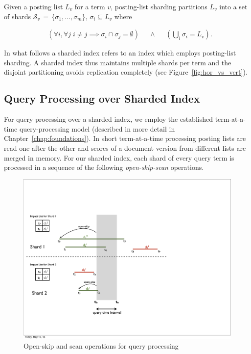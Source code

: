 \begin{definition}
Given a posting list $L_{v}$ for a term $v$, posting-list sharding partitions $L_{v}$ into a set of shards $\mathcal{S}_v \,=\, \{\sigma_1, \ldots, \sigma_{m}\}, \, \sigma_{i} \subseteq L_{v}$ where

\begin{equation*}
	\begin{aligned}
		& \left( \forall i,\forall j \; i \neq j \implies \sigma_{i} \cap \sigma_{j} = \emptyset \right) 
		& & \wedge & 
		& \left( \bigcup_{i}{\sigma_i} =  L_{v} \right).  
	\end{aligned}
\end{equation*}

\end{definition}

In what follows a sharded index refers to an index which employs posting-list sharding. A sharded index thus maintains multiple shards per term and the disjoint partitioning avoids replication completely (see Figure~\ref{fig:hor_vs_vert}). 

\subsection{Query Processing over Sharded Index}

For query processing over a sharded index, we employ the established term-at-a-time query-processing 
model (described in more detail in Chapter~\ref{chap:foundations}). In short term-at-a-time processing posting lists are read one after the other and scores of a document version from different lists are merged in memory. For our sharded index, each shard of every query term is processed in a sequence of the following \emph{open-skip-scan} operations.

\begin{figure}[tb]
	\centering
		\includegraphics[width=\textwidth]{resources/qp_shards.pdf}
	\caption{Open-skip and scan operations for query processing}
	 \label{fig:open-skip-scan}
\end{figure}

